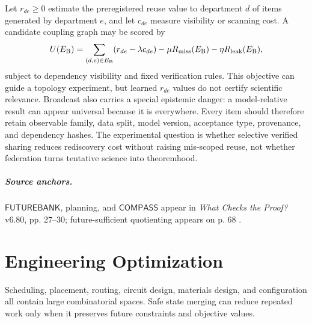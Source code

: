 \documentclass[11pt,oneside]{book}
\theoremstyle{definition}
\theoremstyle{remark}
\newcommand{\FB}{\mathsf{FUTUREBANK}}
\newcommand{\COMPASS}{\mathsf{COMPASS}}
\begin{document}
Let \(r_{de}\ge0\) estimate the preregistered reuse value to department \(d\) of items generated by
department \(e\), and let \(c_{de}\) measure visibility or scanning cost. A candidate coupling graph
may be scored by
\[
U(E_{\rm B})=
\sum_{(d,e)\in E_{\rm B}}(r_{de}-\lambda c_{de})
-\mu R_{\rm miss}(E_{\rm B})-\eta R_{\rm leak}(E_{\rm B}),
\]
subject to dependency visibility and fixed verification rules. This objective can guide a topology
experiment, but learned \(r_{de}\) values do not certify scientific relevance. Broadcast also carries
a special epistemic danger: a model-relative result can appear universal because it is everywhere.
Every item should therefore retain observable family, data split, model version, acceptance type,
provenance, and dependency hashes. The experimental question is whether selective verified sharing
reduces rediscovery cost without raising mis-scoped reuse, not whether federation turns tentative
science into theoremhood.

\paragraph{Source anchors.} \(\FB\), planning, and \(\COMPASS\) appear in
\emph{What Checks the Proof?} v6.80, pp. 27--30; future-sufficient quotienting appears on p. 68
\cite{TennesonChecks}.

\chapter{Engineering Optimization}
\label{ch:engineering}

Scheduling, placement, routing, circuit design, materials design, and configuration all contain large
combinatorial spaces. Safe state merging can reduce repeated work only when it preserves future
constraints and objective values.
\end{document}
